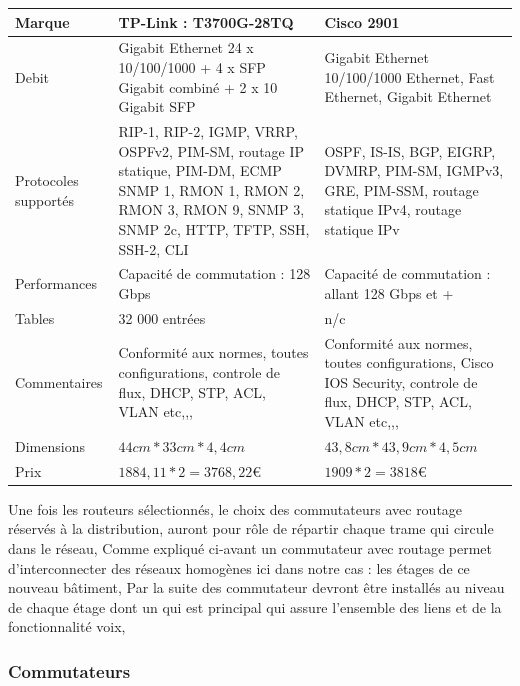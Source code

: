     \begin{center}
        \begin{tabular}{|l|p{5cm}|p{5cm}|}
          \hline
            Marque  &   TP-Link : T3700G-28TQ    &   Cisco 2901 \\
          \hline
            Debit  &
Gigabit Ethernet
24 x 10/100/1000 + 4 x SFP Gigabit combiné + 2 x 10 Gigabit SFP
   &   Gigabit Ethernet
10/100/1000
Ethernet, Fast Ethernet, Gigabit Ethernet \\
          \hline

Protocoles supportés
  &   RIP-1, RIP-2, IGMP, VRRP, OSPFv2, PIM-SM, routage IP statique, PIM-DM, ECMP
SNMP 1, RMON 1, RMON 2, RMON 3, RMON 9, SNMP 3, SNMP 2c, HTTP, TFTP, SSH, SSH-2, CLI   &   OSPF, IS-IS, BGP, EIGRP, DVMRP, PIM-SM, IGMPv3, GRE, PIM-SSM, routage statique IPv4, routage statique IPv \\
          \hline
            Performances  &
Capacité de commutation : 128 Gbps
   &
Capacité de commutation : allant 128 Gbps et +
 \\
          \hline
            Tables  &
32 000 entrées
   &
n/c
 \\
          \hline
            Commentaires  &
Conformité aux normes, toutes configurations, controle de flux, DHCP, STP, ACL, VLAN etc,,,
   &
Conformité aux normes, toutes configurations, Cisco IOS Security, controle de flux, DHCP, STP, ACL, VLAN etc,,,
 \\
          \hline
            Dimensions  &
$44 cm * 33 cm * 4,4 cm$
   &
$43,8 cm * 43,9 cm * 4,5 cm$
 \\
          \hline
            Prix
            &
            $1884,11 * 2 = 3768,22   \euro$
            &
            $1909 * 2 = 3818   \euro$
 \\
          \hline
        \end{tabular}
    \end{center}

Une fois les routeurs sélectionnés, le choix des commutateurs avec routage réservés à la distribution, auront pour rôle de répartir chaque trame qui circule dans le réseau, Comme expliqué ci-avant un commutateur avec routage permet d'interconnecter des réseaux homogènes ici dans notre cas : les étages de ce nouveau bâtiment,
Par la suite des commutateur devront être installés au niveau de chaque étage dont un qui est principal qui assure l'ensemble des liens et de la fonctionnalité voix,


\subsubsection{Commutateurs}

